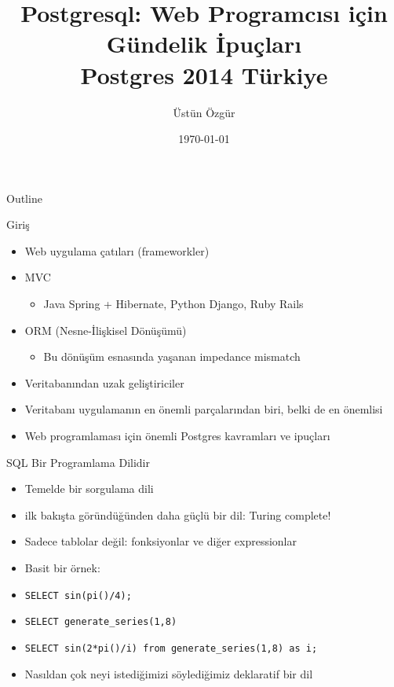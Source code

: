 \documentclass[presentation]{beamer}
\author{Üstün Özgür}
\date{\today}
\title{Postgresql: Web Programcısı için Gündelik İpuçları \\ Postgres 2014 Türkiye}
\begin{document}
\maketitle
\begin{frame}{Outline}
\tableofcontents
\end{frame}


\begin{frame}[label=sec-1]{Giriş}
\begin{itemize}
\item Web uygulama çatıları (frameworkler)

\item MVC
\begin{itemize}
\item Java Spring + Hibernate, Python Django, Ruby Rails
\end{itemize}
\item ORM (Nesne-İlişkisel Dönüşümü)
\begin{itemize}
\item Bu dönüşüm esnasında yaşanan impedance mismatch
\end{itemize}
\item Veritabanından uzak geliştiriciler
\item Veritabanı uygulamanın en önemli parçalarından biri, belki de en önemlisi
\item Web programlaması için önemli Postgres kavramları ve ipuçları
\end{itemize}
\end{frame}

\begin{frame}[fragile,label=sec-2]{SQL Bir Programlama Dilidir}
 \begin{itemize}
\item Temelde bir sorgulama dili
\item ilk bakışta göründüğünden daha güçlü bir dil: Turing complete!
\item Sadece tablolar değil: fonksiyonlar ve diğer expressionlar
\item Basit bir örnek:
\end{itemize}
\begin{itemize}
\item \texttt{SELECT sin(pi()/4);}
\item \texttt{SELECT generate\_series(1,8)}
\item \texttt{SELECT sin(2*pi()/i) from generate\_series(1,8) as i;}
\item Nasıldan çok neyi istediğimizi söylediğimiz deklaratif bir dil
\end{itemize}
\end{frame}
\end{document}
